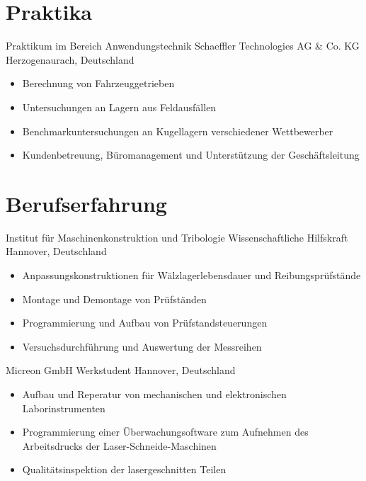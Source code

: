 \documentclass[11pt,a4paper,sans]{moderncv}
\begin{document}
\section{\textbf{Praktika}}
{Praktikum im Bereich Anwendungstechnik}
{Schaeffler Technologies AG \& Co. KG}
{Herzogenaurach, Deutschland}
{}
{
    \begin{itemize}
        \item Berechnung von Fahrzeuggetrieben
        \item Untersuchungen an Lagern aus Feldausfällen
        \item Benchmarkuntersuchungen an Kugellagern verschiedener Wettbewerber
        \item Kundenbetreuung, Büromanagement und Unterstützung der Geschäftsleitung
    \end{itemize}
}


\section{\textbf{Berufserfahrung}}

{Institut für Maschinenkonstruktion und Tribologie}
{Wissenschaftliche Hilfskraft}
{Hannover, Deutschland}
{}
{
    \begin{itemize}
        \item Anpassungskonstruktionen für Wälzlagerlebensdauer und Reibungsprüfstände
        \item Montage und Demontage von Prüfständen
        \item Programmierung und Aufbau von Prüfstandsteuerungen
        \item Versuchsdurchführung und Auswertung der Messreihen
    \end{itemize}
}

{Micreon GmbH}
{Werkstudent}
{Hannover, Deutschland}
{}
{
    \begin{itemize}
        \item Aufbau und Reperatur von mechanischen und elektronischen Laborinstrumenten
        \item Programmierung einer Überwachungsoftware zum Aufnehmen des Arbeitsdrucks der Laser-Schneide-Maschinen
        \item Qualitätsinspektion der lasergeschnitten Teilen
    \end{itemize}
}
\end{document}
